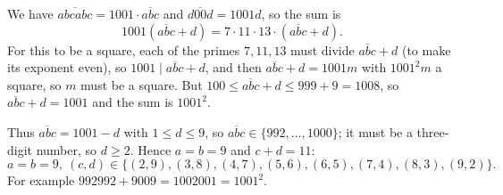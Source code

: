 We have $\overline{abcabc}=1001\cdot\overline{abc}$ and $\overline{d00d}=1001d$, so the sum is
\[
1001\left(\overline{abc}+d\right)=7\cdot11\cdot13\cdot\left(\overline{abc}+d\right).
\]
For this to be a square, each of the primes $7,11,13$ must divide $\overline{abc}+d$ (to make its exponent even), so $1001\mid\overline{abc}+d$, and then $\overline{abc}+d=1001m$ with $1001^2m$ a square, so $m$ must be a square. But $100\le\overline{abc}+d\le999+9=1008$, so $\overline{abc}+d=1001$ and the sum is $1001^2$.

Thus $\overline{abc}=1001-d$ with $1\le d\le9$, so $\overline{abc}\in\{992,\dots,1000\}$; it must be a three-digit number, so $d\ge2$. Hence $a=b=9$ and $c+d=11$:
\[
\boxed{a=b=9,\ (c,d)\in\{(2,9),(3,8),(4,7),(5,6),(6,5),(7,4),(8,3),(9,2)\}} .
\]
For example $992992+9009=1002001=1001^2$.

